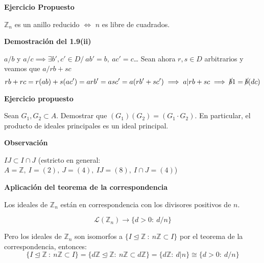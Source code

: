 \documentclass[openany]{book}
\begin{document}
\begin{exercise}
    \textbf{Ejercicio Propuesto}

    $ \mathbb{Z}_{n}$ es un anillo reducido $ \iff $ $ n $ es libre de cuadrados.

\end{exercise}\vspace{5mm}
\textbf{Demostración del 1.9(ii)}

\begin{demonstration}
    $ a/b $ y $ a/c \implies \exists b',c' \in D /\ ab'=b,\ ac'=c$\dots
    Sean ahora $ r,s \in D $ arbitrarios y veamos que $ a/rb+sc $
    $$ rb+rc=r(ab)+s(ac') = arb' =  asc' = a(rb'+sc') \implies a | rb+sc \implies \cancel{b}1 = \cancel{b}(dc) $$
\end{demonstration}



\begin{exercise}
    \textbf{Ejercicio propuesto}

    Sean $ G_1,G_2 \subset A $. Demostrar que $ (G_1)(G_2)= (G_1\cdot G_2) $. En particular, el producto de ideales principales es un ideal principal.
\end{exercise}

\begin{flushright}
    \textbf{Observación}

\end{flushright}


$ IJ \subset I \cap J $ (estricto en general: $ A = \mathbb{Z},\ I =(2),\ J=(4),\ IJ=(8),\ I\cap J = (4) $)


\begin{example}
    \textbf{Aplicación del teorema de la correspondencia}

    Los ideales de $ \mathbb{Z}_{n} $ están en correspondencia con los divisores positivos de $ n $.

    $$ \mathcal{L}(\mathbb{Z}_{n}) \to \{d>0:\ d/n\} $$

    Pero los ideales de $ \mathbb{Z}_{n} $ son isomorfos a $ \{I \unlhd \mathbb{Z}\ :\ n\mathbb{Z} \subset  I\}$ por el teorema de la correspondencia, entonces:
    $$\{I \unlhd \mathbb{Z}\ :\ n\mathbb{Z} \subset  I\} = \{d\mathbb{Z} \unlhd \mathbb{Z}:\ n\mathbb{Z} \subset  d\mathbb{Z}\} = \{d\mathbb{Z}:\ d|n\}\cong \{d>0:\ d/n\}$$
\end{example}
\end{document}
